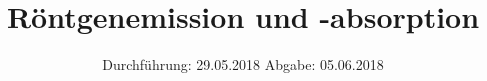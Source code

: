 

\subject{VERSUCH 602}
\title{Röntgenemission und -absorption}
\date{%
  Durchführung: 29.05.2018
  \hspace{3em}
  Abgabe: 05.06.2018
}



\maketitle
\thispagestyle{empty}
\tableofcontents
\newpage







\printbibliography{}


